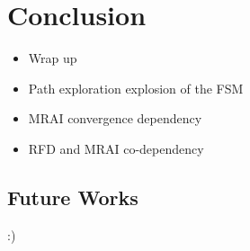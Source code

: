 \chapter{Conclusion}
\label{cha:conclusion}

\begin{itemize}
    \item Wrap up
    \item Path exploration explosion of the FSM
    \item MRAI convergence dependency
    \item RFD and MRAI co-dependency 
\end{itemize}

\section{Future Works}
\label{sec:future_works}

:)
